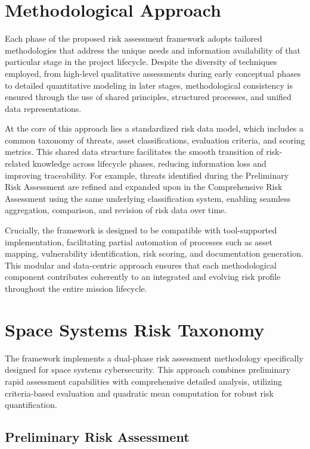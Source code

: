 \documentclass[binding=0.6cm]{sapthesis}
\begin{document}
\section{Methodological Approach}

Each phase of the proposed risk assessment framework adopts tailored methodologies that address the unique needs and information availability of that particular stage in the project lifecycle. Despite the diversity of techniques employed, from high-level qualitative assessments during early conceptual phases to detailed quantitative modeling in later stages, methodological consistency is ensured through the use of shared principles, structured processes, and unified data representations.

At the core of this approach lies a standardized risk data model, which includes a common taxonomy of threats, asset classifications, evaluation criteria, and scoring metrics. This shared data structure facilitates the smooth transition of risk-related knowledge across lifecycle phases, reducing information loss and improving traceability. For example, threats identified during the Preliminary Risk Assessment are refined and expanded upon in the Comprehensive Risk Assessment using the same underlying classification system, enabling seamless aggregation, comparison, and revision of risk data over time.

Crucially, the framework is designed to be compatible with tool-supported implementation, facilitating partial automation of processes such as asset mapping, vulnerability identification, risk scoring, and documentation generation. This modular and data-centric approach ensures that each methodological component contributes coherently to an integrated and evolving risk profile throughout the entire mission lifecycle.

\section{Space Systems Risk Taxonomy}
The framework implements a dual-phase risk assessment methodology specifically designed for space systems cybersecurity. This approach combines preliminary rapid assessment capabilities with comprehensive detailed analysis, utilizing criteria-based evaluation and quadratic mean computation for robust risk quantification.

\subsection{Preliminary Risk Assessment}
\end{document}

